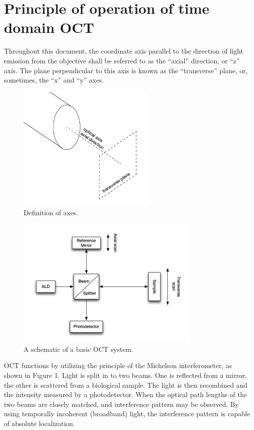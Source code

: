 \section{Principle of operation of time domain OCT}
\label{sec:principles_oct}

Throughout this document, the coordinate axis parallel to the direction of light emission from the objective shall be referred to as the ``axial'' direction, or ``z'' axis. The plane perpendicular to this axis is known as the ``transverse'' plane, or, sometimes, the ``x'' and ``y'' axes.

\begin{figure}[h!]
\centering
\includegraphics[width=0.6\textwidth]{Images/Background/axes.png}
\caption{Definition of axes.}
\end{figure}

\begin{figure}[h!]
  \centering
    \includegraphics[width=0.8\textwidth]{Images/Background/basic_oct.png}
      \caption{A schematic of a basic OCT system.}
\end{figure}


OCT functions by utilizing the principle of the Michelson interferometer, as shown in Figure 1. Light is split in to two beams. One is reflected from a mirror, the other is scattered from a biological sample. The light is then recombined and the intensity measured by a photodetector. When the optical path lengths of the two beams are closely matched, and interference pattern may be observed. By using temporally incoherent (broadband) light, the interference pattern is capable of absolute localization.

